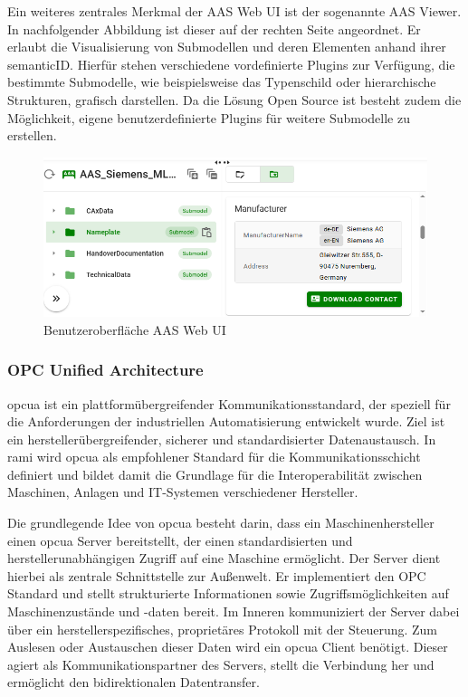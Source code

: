 Ein weiteres zentrales Merkmal der AAS Web UI ist der sogenannte AAS Viewer.
In nachfolgender Abbildung ist dieser auf der rechten Seite angeordnet.
Er erlaubt die Visualisierung von Submodellen und deren Elementen anhand ihrer semanticID. 
Hierfür stehen verschiedene vordefinierte Plugins zur Verfügung, die bestimmte Submodelle, wie beispielsweise das Typenschild oder hierarchische Strukturen, grafisch darstellen.
Da die Lösung Open Source ist besteht zudem die Möglichkeit, eigene benutzerdefinierte Plugins für weitere Submodelle zu erstellen. \cite{BaSyxWiki} \cite{BaSyxEclipse}

\begin{figure}[htbp]
    \centering
    \includegraphics[width=1\textwidth]{Bilder/BaSyx/Grundlagen.png}
    \caption{Benutzeroberfläche AAS Web UI}
    \label{fig:BasyxWebUI}
\end{figure}

\subsubsection{OPC Unified Architecture}
\acs{opcua} ist ein plattformübergreifender Kommunikationsstandard, der speziell für die Anforderungen der industriellen Automatisierung entwickelt wurde.
Ziel ist ein herstellerübergreifender, sicherer und standardisierter Datenaustausch.
In \acs{rami} \cite{RAMI4.0} wird \acs{opcua} als empfohlener Standard für die Kommunikationsschicht definiert und bildet damit die Grundlage für die Interoperabilität zwischen Maschinen, Anlagen und IT-Systemen verschiedener Hersteller.

Die grundlegende Idee von \acs{opcua} besteht darin, dass ein Maschinenhersteller einen \acs{opcua} Server bereitstellt, der einen standardisierten und herstellerunabhängigen Zugriff auf eine Maschine ermöglicht.
Der Server dient hierbei als zentrale Schnittstelle zur Außenwelt. Er implementiert den OPC Standard und stellt strukturierte Informationen sowie Zugriffsmöglichkeiten auf Maschinenzustände und -daten bereit.
Im Inneren kommuniziert der Server dabei über ein herstellerspezifisches, proprietäres Protokoll mit der Steuerung.
Zum Auslesen oder Austauschen dieser Daten wird ein \acs{opcua} Client benötigt. Dieser agiert als Kommunikationspartner des Servers, stellt die Verbindung her und ermöglicht den bidirektionalen Datentransfer. \cite{OPCUA}